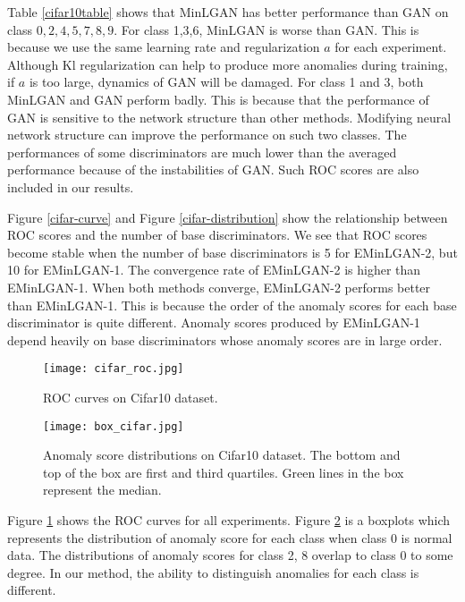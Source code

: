 \documentclass[a4paper,conference]{IEEEtran}
\begin{document}
 Table \ref{cifar10table} shows that MinLGAN has better performance than GAN on class $0, 2, 4, 5, 7, 8, 9$. For class 1,3,6, MinLGAN is worse than GAN. This is because we use the same learning rate and regularization $a$ for each experiment. Although Kl regularization can help to produce more anomalies during training, if $a$ is too large, dynamics of GAN will be damaged. For class 1 and 3, both MinLGAN and GAN perform badly.  This is because that  the performance of  GAN is  sensitive to the network structure than other methods. Modifying neural network structure can improve the performance on such two classes. The performances of some discriminators are much lower than the averaged performance because of the instabilities of GAN.  Such ROC scores are also included in our results.

Figure \ref{cifar-curve} and Figure \ref{cifar-distribution} show the relationship between ROC scores and the number of base discriminators. We see that ROC scores become stable when the number of base discriminators is 5 for EMinLGAN-2, but 10 for EMinLGAN-1. The convergence rate of EMinLGAN-2 is higher than EMinLGAN-1. When both methods converge, EMinLGAN-2 performs better than EMinLGAN-1. This is because the order of the anomaly scores for each base discriminator is quite different. Anomaly scores produced by EMinLGAN-1 depend heavily on  base discriminators whose anomaly scores are in large order.

\begin{figure}[h]
\small\center
\texttt{[image: cifar\_roc.jpg]}
\caption{ROC curves on Cifar10 dataset\label{cifar-roc-curve}. }
\end{figure}
\begin{figure}[h]
\small\center
\texttt{[image: box\_cifar.jpg]}
\setlength{\belowcaptionskip}{-0.3cm}
\caption{ Anomaly score distributions on Cifar10 dataset\label{cifar-box}. The bottom and top of the box are first and third quartiles. Green lines in the box represent the median.}

\end{figure}
Figure \ref{cifar-roc-curve} shows the ROC curves for all experiments. Figure \ref{cifar-box} is a boxplots which represents the distribution of anomaly score for each class when class $0$ is normal data. The distributions of  anomaly scores for class 2, 8 overlap to class 0 to some degree. In our method, the ability to distinguish anomalies for each class is different.
\end{document}
